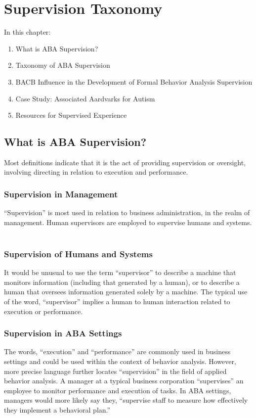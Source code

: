 \chapter{Supervision Taxonomy}
%
In this chapter:
\begin{enumerate}
\item What is ABA Supervision?
\item Taxonomy of ABA Supervision
\item BACB\textregistered{} Influence in the Development of Formal Behavior Analysis Supervision
\item Case Study: Associated Aardvarks for Autism
\item Resources for Supervised Experience
\end{enumerate}

\section{What is ABA Supervision?}
Most definitions indicate that it is the act of providing supervision or oversight, involving directing in relation to execution and performance.

\subsection{Supervision in Management}
``Supervision'' is most used in relation to business administration, in the realm of management. Human supervisors are employed to supervise humans and systems. 
 
\subsection{Supervision of Humans and Systems}
It would be unusual to use the term ``supervisor'' to describe a machine that monitors information (including that generated by a human), or to describe a human that oversees information generated solely by a machine. The typical use of the word, ``supervisor'' implies a human to human interaction related to execution or performance. 
  
\subsection{Supervision in ABA Settings}
The words, ``execution'' and ``performance'' are commonly used in business settings and could be used within the context of behavior analysis. However, more precise language further locates ``supervision'' in the field of applied behavior analysis. A manager at a typical business corporation ``supervises'' an employee to monitor performance and execution of tasks. In ABA settings, managers would more likely say they, ``supervise staff to measure how effectively they implement a behavioral plan.'' 
 
